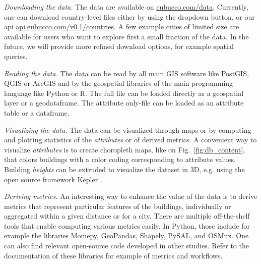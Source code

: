 \documentclass[fleqn,10pt]{wlscirep}
\begin{document}
\medskip \noindent \textit{Downloading the data.} \hspace{0.1cm}
The data are available on \url{eubucco.com/data}. Currently, one can download country-level files either by using the dropdown button, or our api \url{api.eubucco.com/v0.1/countries}. A few example cities of limited size are available for users who want to explore first a small fraction of the data. In the future, we will provide more refined download options, for example spatial queries.  

\medskip \noindent \textit{Reading the data.} \hspace{0.1cm}
The data can be read by all main GIS software like PostGIS, QGIS or ArcGIS and by the geospatial libraries of the main programming language like Python or R. The full file can be loaded directly as a geospatial layer or a geodataframe. The attribute only-file can be loaded as an attribute table or a dataframe. 

\medskip \noindent \textit{Visualizing the data.} \hspace{0.1cm} 
The data can be visualized through maps or by computing and plotting statistics of the \textit{attributes} or of derived metrics. A convenient way to visualize \textit{attributes} is to create choropleth maps, like on Fig.~\ref{fig:db_content}, that colors buildings with a color coding corresponding to attribute values. Building \textit{heights} can be extruded to visualize the dataset in 3D, e.g. using the open source framework Kepler \cite{kepler2021}. 

\medskip \noindent \textit{Deriving metrics.} \hspace{0.1cm} 
An interesting way to enhance the value of the data is to derive metrics that represent particular features of the buildings, individually or aggregated within a given distance or for a city. There are multiple off-the-shelf tools that enable computing various metrics easily. In Python, those include for example the libraries Momepy\cite{fleischmann2019momepy}, GeoPandas\cite{kelsey_jordahl_2020_3946761}, Shapely\cite{gillies_2021}, PySAL\cite{rey2010pysal}, and OSMnx\cite{boeing2017osmnx}. One can also find relevant open-source code developed in other studies\cite{2022_ceus_gbmi,milojevic2020learning}. Refer to the documentation of these libraries for example of metrics and workflows.
\end{document}
